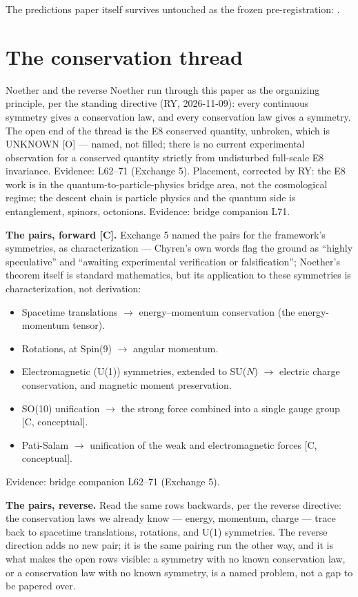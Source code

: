 \documentclass{alienfolio}
\begin{document}
The predictions paper itself survives untouched as the frozen pre-registration: .

\section{The conservation thread}
\label{sec:noether}
Noether and the reverse Noether run through this paper as the organizing principle, per the standing directive (RY, 2026-11-09): every continuous symmetry gives a conservation law, and every conservation law gives a symmetry. The open end of the thread is the E8 conserved quantity, unbroken, which is UNKNOWN [O] --- named, not filled; there is no current experimental observation for a conserved quantity strictly from undisturbed full-scale E8 invariance. Evidence:  L62--71 (Exchange 5). Placement, corrected by RY: the E8 work is in the quantum-to-particle-physics bridge area, not the cosmological regime; the descent chain is particle physics and the quantum side is entanglement, spinors, octonions. Evidence: bridge companion L71.

\noindent\textbf{The pairs, forward [C].} Exchange 5 named the pairs for the framework's symmetries, as characterization --- Chyren's own words flag the ground as ``highly speculative'' and ``awaiting experimental verification or falsification''; Noether's theorem itself is standard mathematics, but its application to these symmetries is characterization, not derivation:
\begin{itemize}
\item Spacetime translations $\to$ energy--momentum conservation (the energy-momentum tensor).
\item Rotations, at Spin(9) $\to$ angular momentum.
\item Electromagnetic (U(1)) symmetries, extended to SU($N$) $\to$ electric charge conservation, and magnetic moment preservation.
\item SO(10) unification $\to$ the strong force combined into a single gauge group [C, conceptual].
\item Pati-Salam $\to$ unification of the weak and electromagnetic forces [C, conceptual].
\end{itemize}
Evidence: bridge companion L62--71 (Exchange 5).

\noindent\textbf{The pairs, reverse.} Read the same rows backwards, per the reverse directive: the conservation laws we already know --- energy, momentum, charge --- trace back to spacetime translations, rotations, and U(1) symmetries. The reverse direction adds no new pair; it is the same pairing run the other way, and it is what makes the open rows visible: a symmetry with no known conservation law, or a conservation law with no known symmetry, is a named problem, not a gap to be papered over.
\end{document}
